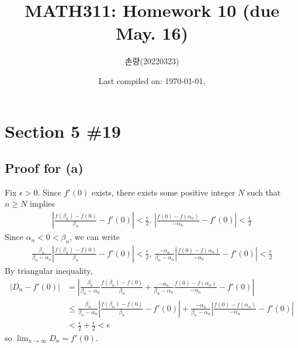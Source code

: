\documentclass{scrartcl}
\title{MATH311: Homework 10 (due May. 16)}
\author{손량(20220323)}
\date{Last compiled on: \today, \currenttime}
\begin{document}
\maketitle

\section{Section 5 \#19}
\subsection{Proof for (a)}
Fix \(\epsilon > 0\).
Since \(f'(0)\) exists, there exists some positive integer \(N\) such that \(n \geq N\) implies
\begin{align*}
  \left| \frac{f(\beta_n) - f(0)}{\beta_n} - f'(0) \right| < \frac{\epsilon}{2},\,
  \left| \frac{f(0) - f(\alpha_n)}{-\alpha_n} - f'(0) \right| < \frac{\epsilon}{2}
\end{align*}
Since \(\alpha_n < 0 < \beta_n\), we can write
\begin{align*}
  \frac{\beta_n}{\beta_n - \alpha_n} \left| \frac{f(\beta_n) - f(0)}{\beta_n} - f'(0) \right| < \frac{\epsilon}{2},\,
  \frac{-\alpha_n}{\beta_n - \alpha_n} \left| \frac{f(0) - f(\alpha_n)}{-\alpha_n} - f'(0) \right| < \frac{\epsilon}{2}
\end{align*}
By triangular inequality,
\begin{align*}
  \left| D_n - f'(0) \right|
  &= \left| \frac{\beta_n}{\beta_n - \alpha_n} \frac{f(\beta_n) - f(0)}{\beta_n} + \frac{-\alpha_n}{\beta_n - \alpha_n} \frac{f(0) - f(\alpha_n)}{-\alpha_n} - f'(0) \right| \\
  &\leq \frac{\beta_n}{\beta_n - \alpha_n} \left| \frac{f(\beta_n) - f(0)}{\beta_n} - f'(0) \right| + \frac{-\alpha_n}{\beta_n - \alpha_n} \left| \frac{f(0) - f(\alpha_n)}{-\alpha_n} - f'(0) \right| \\
  &< \frac{\epsilon}{2} + \frac{\epsilon}{2} < \epsilon
\end{align*}
so \(\lim_{n \to \infty} D_n = f'(0)\).
\end{document}
